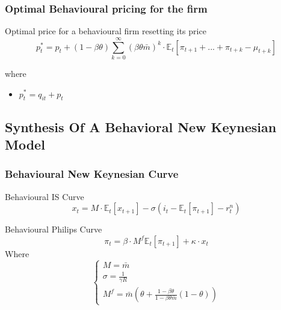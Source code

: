 \documentclass{beamer}
\begin{document}
\subsubsection{Optimal Behavioural pricing for the firm}
\begin{frame}{\subsecname}
Optimal price for a behavioural firm resetting its price
\begin{equation}\tag{27}
    p^{*}_{t}=p_{t}+(1-\beta\theta)\sum_{k=0}^{\infty}\left(\beta\theta\bar{m}\right)^{k}\cdot\mathbb{E}_{t}\left[\pi_{t+1}+...+\pi_{t+k}-\mu_{t+k}\right]
\end{equation}

where
\begin{itemize}
    \item $p^{*}_{t}= q_{it}+p_{t}$ 
\end{itemize}

\end{frame}

\subsection{Synthesis Of A Behavioral New Keynesian Model}
\subsubsection{Behavioural New Keynesian Curve}
\begin{frame}{\subsecname}
Behavioural IS Curve
\begin{equation}\tag{29}
    x_{t}=M\cdot\mathbb{E}_{t}\left[x_{t+1}\right]-\sigma(i_{t}-\mathbb{E}_{t}\left[\pi_{t+1}\right]-r^{n}_{t})
\end{equation}

Behavioural Philips Curve
\begin{equation}\tag{30}
    \pi_{t}=\beta\cdot M^{f} \mathbb{E}_t\left[\pi_{t+1}\right]+\kappa\cdot x_{t}
\end{equation}
Where
\begin{equation}\tag{31}
    \begin{cases}
        M=\bar{m} \\
        \sigma=\frac{1}{\gamma R} \\
        M^{f}=\bar{m}\left(\theta+\frac{1-\beta\theta}{1-\beta\theta\bar{m}}(1-\theta)\right)
    \end{cases}
\end{equation}

\end{frame}
\end{document}
